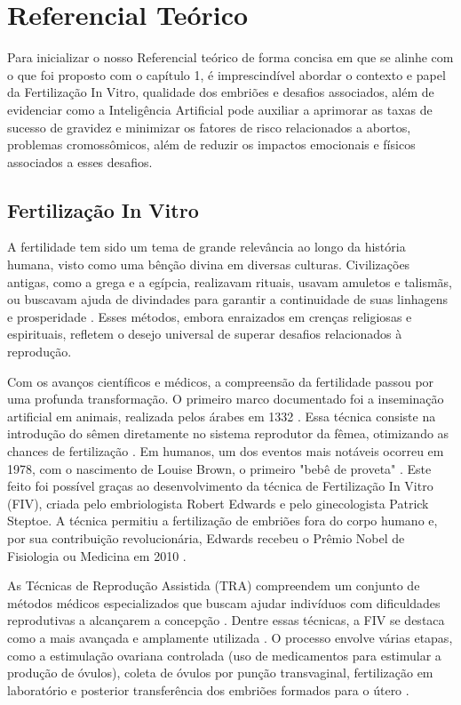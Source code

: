 \chapter[Referencial Teórico]{Referencial Teórico}

Para inicializar o nosso Referencial teórico de forma concisa em que se alinhe com o que foi proposto com o capítulo 1, é imprescindível abordar o contexto e papel da Fertilização In Vitro, qualidade dos embriões e desafios associados, além de evidenciar como a Inteligência Artificial pode auxiliar a aprimorar as taxas de sucesso de gravidez e minimizar os fatores de risco relacionados a abortos, problemas cromossômicos, além de reduzir os impactos emocionais e físicos associados a esses desafios.

\section{Fertilização In Vitro}

A fertilidade tem sido um tema de grande relevância ao longo da história humana, visto como uma bênção divina em diversas culturas. Civilizações antigas, como a grega e a egípcia, realizavam rituais, usavam amuletos e talismãs, ou buscavam ajuda de divindades para garantir a continuidade de suas linhagens e prosperidade \cite{moura2020}. Esses métodos, embora enraizados em crenças religiosas e espirituais, refletem o desejo universal de superar desafios relacionados à reprodução.

Com os avanços científicos e médicos, a compreensão da fertilidade passou por uma profunda transformação. O primeiro marco documentado foi a inseminação artificial em animais, realizada pelos árabes em 1332 \cite{moura2020}. Essa técnica consiste na introdução do sêmen diretamente no sistema reprodutor da fêmea, otimizando as chances de fertilização \cite{corleta2010}. Em humanos, um dos eventos mais notáveis ocorreu em 1978, com o nascimento de Louise Brown, o primeiro "bebê de proveta" \cite{moura2020}. Este feito foi possível graças ao desenvolvimento da técnica de Fertilização In Vitro (FIV), criada pelo embriologista Robert Edwards e pelo ginecologista Patrick Steptoe. A técnica permitiu a fertilização de embriões fora do corpo humano e, por sua contribuição revolucionária, Edwards recebeu o Prêmio Nobel de Fisiologia ou Medicina em 2010 \cite{corleta2010}.

As Técnicas de Reprodução Assistida (TRA) compreendem um conjunto de métodos médicos especializados que buscam ajudar indivíduos com dificuldades reprodutivas a alcançarem a concepção \cite{souzamarise2024}. Dentre essas técnicas, a FIV se destaca como a mais avançada e amplamente utilizada \cite{moura2020}. O processo envolve várias etapas, como a estimulação ovariana controlada (uso de medicamentos para estimular a produção de óvulos), coleta de óvulos por punção transvaginal, fertilização em laboratório e posterior transferência dos embriões formados para o útero \cite{moura2020}.

